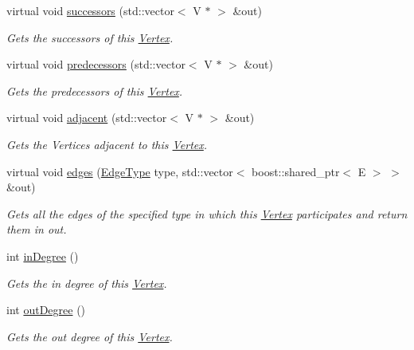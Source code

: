 \begin{DoxyCompactItemize}
virtual void \hyperlink{classrepast_1_1_undirected_vertex_a56412695224db7050d7221b5c714d826}{successors} (std\-::vector$<$ V $\ast$ $>$ \&out)
\begin{DoxyCompactList}\small\item\em Gets the successors of this \hyperlink{classrepast_1_1_vertex}{Vertex}. \end{DoxyCompactList}\item 
virtual void \hyperlink{classrepast_1_1_undirected_vertex_ab1c49c0e2c934c6e4a85c52ed54f4da7}{predecessors} (std\-::vector$<$ V $\ast$ $>$ \&out)
\begin{DoxyCompactList}\small\item\em Gets the predecessors of this \hyperlink{classrepast_1_1_vertex}{Vertex}. \end{DoxyCompactList}\item 
virtual void \hyperlink{classrepast_1_1_undirected_vertex_ae3637a55efcc146a09d58edc5b3beb28}{adjacent} (std\-::vector$<$ V $\ast$ $>$ \&out)
\begin{DoxyCompactList}\small\item\em Gets the Vertices adjacent to this \hyperlink{classrepast_1_1_vertex}{Vertex}. \end{DoxyCompactList}\item 
virtual void \hyperlink{classrepast_1_1_undirected_vertex_a3b87912676b53a0352dff58cfa1222fe}{edges} (\hyperlink{classrepast_1_1_vertex_a8b4819d648c7c0dd8b0622beea77cc14}{Edge\-Type} type, std\-::vector$<$ boost\-::shared\-\_\-ptr$<$ E $>$ $>$ \&out)
\begin{DoxyCompactList}\small\item\em Gets all the edges of the specified type in which this \hyperlink{classrepast_1_1_vertex}{Vertex} participates and return them in out. \end{DoxyCompactList}\item 
int \hyperlink{classrepast_1_1_undirected_vertex_a6bb8fff1b36c0363306aa86615cf48f4}{in\-Degree} ()
\begin{DoxyCompactList}\small\item\em Gets the in degree of this \hyperlink{classrepast_1_1_vertex}{Vertex}. \end{DoxyCompactList}\item 
int \hyperlink{classrepast_1_1_undirected_vertex_a262a52d25ccf1f7f6e2433c01f1fb8e8}{out\-Degree} ()
\begin{DoxyCompactList}\small\item\em Gets the out degree of this \hyperlink{classrepast_1_1_vertex}{Vertex}. \end{DoxyCompactList}\end{DoxyCompactItemize}

